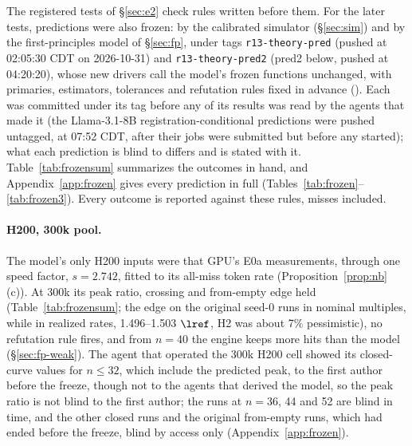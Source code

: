 The registered tests of \S\ref{sec:e2} check rules written before them. For the later tests, predictions were also frozen: by the calibrated simulator (\S\ref{sec:sim}) and by the first-principles model of \S\ref{sec:fp}, under tags \texttt{r13-theory-pred} (pushed at 02:05:30 CDT on 2026-10-31) and \texttt{r13-theory-pred2} (pred2 below, pushed at 04:20:20), whose new drivers call the model's frozen functions unchanged, with primaries, estimators, tolerances and refutation rules fixed in advance (). Each was committed under its tag before any of its results was read by the agents that made it (the Llama-3.1-8B registration-conditional predictions were pushed untagged, at 07:52 CDT, after their jobs were submitted but before any started); what each prediction is blind to differs and is stated with it. Table~\ref{tab:frozensum} summarizes the outcomes in hand, and Appendix~\ref{app:frozen} gives every prediction in full (Tables~\ref{tab:frozen}--\ref{tab:frozen3}). Every outcome is reported against these rules, misses included.

\paragraph{H200, 300k pool.} The model's only H200 inputs were that GPU's E0a measurements, through one speed factor, $s=2.742$, fitted to its all-miss token rate (Proposition~\ref{prop:nb}(c)). At 300k its peak ratio, crossing and from-empty edge held (Table~\ref{tab:frozensum}; the edge on the original seed-0 runs in nominal multiples, while in realized rates, 1.496--1.503 $\lref$, H2 was about 7\% pessimistic), no refutation rule fires, and from $n=40$ the engine keeps more hits than the model (\S\ref{sec:fp-weak}). The agent that operated the 300k H200 cell showed its closed-curve values for $n\le32$, which include the predicted peak, to the first author before the freeze, though not to the agents that derived the model, so the peak ratio is not blind to the first author; the runs at $n=36$, 44 and 52 are blind in time, and the other closed runs and the original from-empty runs, which had ended before the freeze, blind by access only (Appendix~\ref{app:frozen}).

